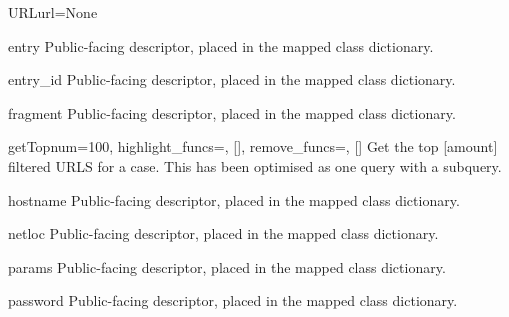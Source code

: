 \documentclass[letterpaper,10pt,english]{manual}
\begin{document}
\begin{classdesc}{URL}{url=None}
\hypertarget{webscavator.model.models.URL.entry}{}\begin{memberdesc}{entry}
Public-facing descriptor, placed in the mapped class dictionary.
\end{memberdesc}

\hypertarget{webscavator.model.models.URL.entry_id}{}\begin{memberdesc}{entry\_id}
Public-facing descriptor, placed in the mapped class dictionary.
\end{memberdesc}

\hypertarget{webscavator.model.models.URL.fragment}{}\begin{memberdesc}{fragment}
Public-facing descriptor, placed in the mapped class dictionary.
\end{memberdesc}

\hypertarget{webscavator.model.models.URL.getTop}{}\begin{staticmethoddesc}{getTop}{num=100, highlight\_funcs=, {[}{]}, remove\_funcs=, {[}{]}}
Get the top {[}amount{]} filtered URLS for a case. This has been optimised as one 
query with a subquery.
\end{staticmethoddesc}

\hypertarget{webscavator.model.models.URL.hostname}{}\begin{memberdesc}{hostname}
Public-facing descriptor, placed in the mapped class dictionary.
\end{memberdesc}

\hypertarget{webscavator.model.models.URL.netloc}{}\begin{memberdesc}{netloc}
Public-facing descriptor, placed in the mapped class dictionary.
\end{memberdesc}

\hypertarget{webscavator.model.models.URL.params}{}\begin{memberdesc}{params}
Public-facing descriptor, placed in the mapped class dictionary.
\end{memberdesc}

\hypertarget{webscavator.model.models.URL.password}{}\begin{memberdesc}{password}
Public-facing descriptor, placed in the mapped class dictionary.
\end{memberdesc}


\end{classdesc}
\end{document}
